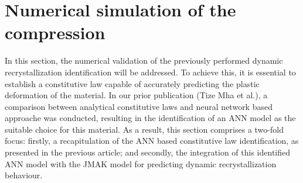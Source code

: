 \documentclass[metals,article,submit,pdftex,moreauthors]{Definitions/mdpi}
\makeatletter
\DeclareRobustCommand{\eal}{et al.\@\xspace}
\makeatother
\begin{document}
\section{Numerical simulation of the compression\label{sec:NumSim}}
In this section, the numerical validation of the previously performed dynamic recrystallization identification will be addressed.
To achieve this, it is essential to establish a constitutive law capable of accurately predicting the plastic deformation of the material.
In our prior publication (Tize Mha \eal \cite{TizeMha-2023}), a comparison between analytical constitutive laws and neural network based approache was conducted, resulting in the identification of an ANN model as the suitable choice for this material.
As a result, this section comprises a two-fold focus: firstly, a recapitulation of the ANN based constitutive law identification, as presented in the previous article; and secondly, the integration of this identified ANN model with the JMAK model for predicting dynamic recrystallization behaviour.
\end{document}
